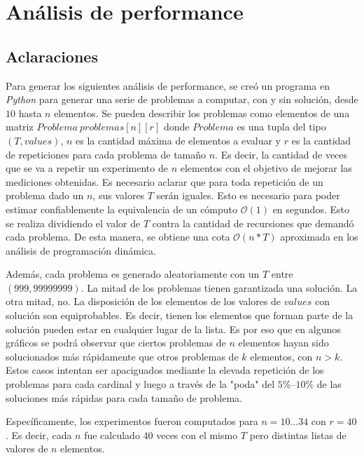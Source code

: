 \section{Análisis de performance}
\subsection{Aclaraciones}
Para generar los siguientes análisis de performance, se creó un programa en \textit{Python} para generar una serie de problemas a computar, con y sin solución, desde $10$ hasta $n$ elementos. Se pueden describir los problemas como elementos de una matriz $Problema \ problemas[n][r]$ donde $Problema$ es una tupla del tipo $(T, values)$, $n$ es la cantidad máxima de elementos a evaluar y $r$ es la cantidad de repeticiones para cada problema de tamaño $n$. Es decir, la cantidad de veces que se va a repetir un experimento de $n$ elementos con el objetivo de mejorar las mediciones obtenidas. Es necesario aclarar que para toda repetición de un problema dado un $n$, sus valores $T$ serán iguales. Esto es necesario para poder estimar confiablemente la equivalencia de un cómputo $\mathcal{O}(1)$ en segundos. Esto se realiza dividiendo el valor de $T$ contra la cantidad de recursiones que demandó cada problema. De esta manera, se obtiene una cota $\mathcal{O}(n*T)$ aproximada en los análisis de programación dinámica.

\vskip 8pt

Además, cada problema es generado aleatoriamente con un $T$ entre $(999, 99999999)$. La mitad de los problemas tienen garantizada una solución. La otra mitad, no. La disposición de los elementos de los valores de $values$ con solución son equiprobables. Es decir, tienen los elementos que forman parte de la solución pueden estar en cualquier lugar de la lista. Es por eso que en algunos gráficos se podrá observar que ciertos problemas de $n$ elementos hayan sido solucionados más rápidamente que otros problemas de $k$ elementos, con $n > k$. Estos casos intentan ser apaciguados mediante la elevada repetición de los problemas para cada cardinal y luego a través de la "poda" del $5\%–10\%$ de las soluciones más rápidas para cada tamaño de problema.

\vskip 8pt

Específicamente, los experimentos fueron computados para $n = 10 ... 34$ con $r = 40$. Es decir, cada $n$ fue calculado 40 veces con el mismo $T$ pero distintas listas de valores de $n$ elementos.

